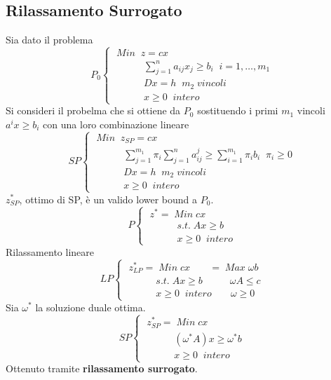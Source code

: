 \subsection{Rilassamento Surrogato}
Sia dato il problema
\begin{displaymath}
P_{0}
\begin{cases}
\;Min\;\;z=cx\\
\;\;\;\;\;\;\;\;\;\;\;\sum_{j=1}^{n}a_{ij}x_{j}\ge b_{i}\;\;i=1,\dots,m_{1}\\
\;\;\;\;\;\;\;\;\;\;\;Dx=h\;\;m_{2}\;vincoli\\
\;\;\;\;\;\;\;\;\;\;\;x\ge 0\;\;intero
\end{cases}
\end{displaymath}
Si consideri il probelma che si ottiene da $P_{0}$ sostituendo i primi $m_{1}$ vincoli $a^{i}x\ge b_{i}$ con una loro combinazione lineare
\begin{displaymath}
SP
\begin{cases}
\;Min\;\;z_{SP}=cx\\
\;\;\;\;\;\;\;\;\;\;\;\sum_{j=1}^{m_{1}}\pi_{i}\sum_{j=1}^{n}a_{ij}^{j}\ge \sum_{i=1}^{m_{1}}\pi_{i}b_{i}\;\;\pi_{i}\ge 0\\
\;\;\;\;\;\;\;\;\;\;\;Dx=h\;\;m_{2}\;vincoli\\
\;\;\;\;\;\;\;\;\;\;\;x\ge 0\;\;intero
\end{cases}
\end{displaymath}
$z_{SP}^{*}$, ottimo di SP, è un valido lower bound a $P_{0}$.
\begin{displaymath}
P
\begin{cases}
\;z^{*}=\;Min\;cx\\
\;\;\;\;\;\;\;\;\;\;\;s.t.\;Ax\ge b\\
\;\;\;\;\;\;\;\;\;\;\;x\ge 0\;\;intero
\end{cases}
\end{displaymath}
Rilassamento lineare
\begin{displaymath}
LP
\begin{cases}
\;z_{LP}^{*}=\;Min\;cx\;\;\;\;\;\;\;=\;Max\;\omega b\\
\;\;\;\;\;\;\;\;\;\;\;s.t.\;Ax\ge b\;\;\;\;\;\;\;\;\;\;\omega A\le c\\
\;\;\;\;\;\;\;\;\;\;\;x\ge 0\;\;intero\;\;\;\;\;\;\;\omega \ge 0
\end{cases}
\end{displaymath}
Sia $\omega^{*}$ la soluzione duale ottima.
\begin{displaymath}
SP
\begin{cases}
\;z_{SP}^{*}=\;Min\;cx\\
\;\;\;\;\;\;\;\;\;\;\;(\omega^{*}A)x\ge\omega^{*}b\\
\;\;\;\;\;\;\;\;\;\;\;x\ge 0\;\;intero
\end{cases}
\end{displaymath}
Ottenuto tramite \textbf{rilassamento surrogato}.

